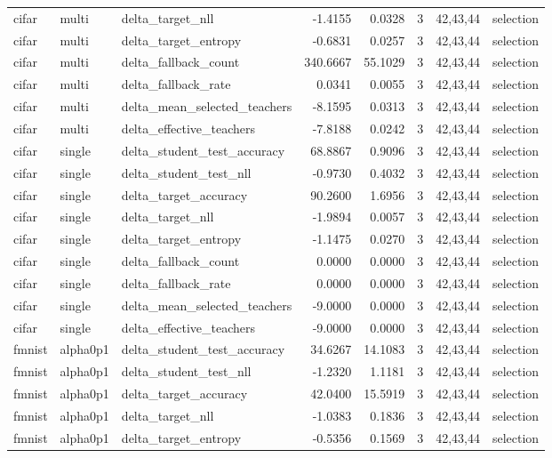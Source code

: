 \begin{tabular}{lllrrrll}
cifar & multi & delta\_target\_nll & -1.4155 & 0.0328 & 3 & 42,43,44 & selection \\
cifar & multi & delta\_target\_entropy & -0.6831 & 0.0257 & 3 & 42,43,44 & selection \\
cifar & multi & delta\_fallback\_count & 340.6667 & 55.1029 & 3 & 42,43,44 & selection \\
cifar & multi & delta\_fallback\_rate & 0.0341 & 0.0055 & 3 & 42,43,44 & selection \\
cifar & multi & delta\_mean\_selected\_teachers & -8.1595 & 0.0313 & 3 & 42,43,44 & selection \\
cifar & multi & delta\_effective\_teachers & -7.8188 & 0.0242 & 3 & 42,43,44 & selection \\
cifar & single & delta\_student\_test\_accuracy & 68.8867 & 0.9096 & 3 & 42,43,44 & selection \\
cifar & single & delta\_student\_test\_nll & -0.9730 & 0.4032 & 3 & 42,43,44 & selection \\
cifar & single & delta\_target\_accuracy & 90.2600 & 1.6956 & 3 & 42,43,44 & selection \\
cifar & single & delta\_target\_nll & -1.9894 & 0.0057 & 3 & 42,43,44 & selection \\
cifar & single & delta\_target\_entropy & -1.1475 & 0.0270 & 3 & 42,43,44 & selection \\
cifar & single & delta\_fallback\_count & 0.0000 & 0.0000 & 3 & 42,43,44 & selection \\
cifar & single & delta\_fallback\_rate & 0.0000 & 0.0000 & 3 & 42,43,44 & selection \\
cifar & single & delta\_mean\_selected\_teachers & -9.0000 & 0.0000 & 3 & 42,43,44 & selection \\
cifar & single & delta\_effective\_teachers & -9.0000 & 0.0000 & 3 & 42,43,44 & selection \\
fmnist & alpha0p1 & delta\_student\_test\_accuracy & 34.6267 & 14.1083 & 3 & 42,43,44 & selection \\
fmnist & alpha0p1 & delta\_student\_test\_nll & -1.2320 & 1.1181 & 3 & 42,43,44 & selection \\
fmnist & alpha0p1 & delta\_target\_accuracy & 42.0400 & 15.5919 & 3 & 42,43,44 & selection \\
fmnist & alpha0p1 & delta\_target\_nll & -1.0383 & 0.1836 & 3 & 42,43,44 & selection \\
fmnist & alpha0p1 & delta\_target\_entropy & -0.5356 & 0.1569 & 3 & 42,43,44 & selection \\

\end{tabular}
